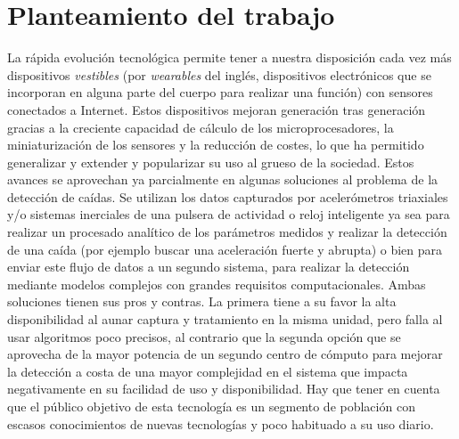\section{Planteamiento del trabajo}\label{sec:intro:planteamiento}

\begin{comment}
¿cómo se puede resolver el problema qué se propone descripción de objetivos en términos generales?
\end{comment}

La rápida evolución tecnológica permite tener a nuestra disposición cada vez más dispositivos \textit{vestibles} (por \textit{wearables} del inglés, dispositivos electrónicos que se incorporan en alguna parte del cuerpo para realizar una función) con sensores conectados a Internet. Estos dispositivos mejoran generación tras generación gracias a la creciente capacidad de cálculo de los microprocesadores, la miniaturización de los sensores y la reducción de costes, lo que ha permitido generalizar y extender y popularizar su uso al grueso de la sociedad. Estos avances se aprovechan ya parcialmente en algunas soluciones al problema de la detección de caídas. Se utilizan los datos capturados por acelerómetros triaxiales y/o sistemas inerciales de una pulsera de actividad o reloj inteligente ya sea para realizar un procesado analítico de los parámetros medidos y realizar la detección de una caída \cite{fallindex00, Chen2005,Bourke2006,Kangas2008,Bagala2012} (por ejemplo buscar una aceleración fuerte y abrupta) o bien para enviar este flujo de datos a un segundo sistema\cite{Luque2014,Vilarinho2015}, para realizar la detección mediante modelos complejos con grandes requisitos computacionales\cite{Cho2014, Aziz2017b,Putra2017}. Ambas soluciones tienen sus pros y contras. La primera tiene a su favor la alta disponibilidad al aunar captura y tratamiento en la misma unidad, pero falla al usar algoritmos poco precisos, al contrario que la segunda opción que se aprovecha de la mayor potencia de un segundo centro de cómputo para mejorar la detección a costa de una mayor complejidad en el sistema que impacta negativamente en su facilidad de uso y disponibilidad. Hay que tener en cuenta que el público objetivo de esta tecnología es un segmento de población con escasos conocimientos de nuevas tecnologías y poco habituado a su uso diario.

